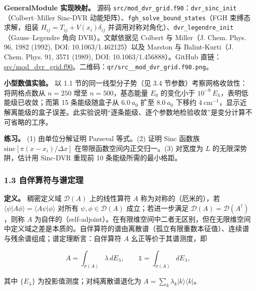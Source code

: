 \documentclass[
]{ctexbook}
\begin{document}
\textbf{GeneralModule 实现映射。} 源码
\texttt{src/mod\_dvr\_grid.f90}：\texttt{dvr\_sinc\_init}（Colbert--Miller
Sinc-DVR 动能矩阵）、\texttt{fgh\_solve\_bound\_states}（FGH
束缚态求解，组装 \(H_{ij}=T_{ij}+V(x_i)\delta_{ij}\)
并调用对称对角化）、\texttt{dvr\_legendre\_init}（Gauss--Legendre 角向
DVR）。文献依据见 Colbert 与 Miller（J. Chem. Phys. 96, 1982 (1992),
DOI: 10.1063/1.462125）以及 Marston 与 Balint-Kurti（J. Chem. Phys. 91,
3571 (1989), DOI: 10.1063/1.456888）。GitHub
直链：\href{https://github.com/l1Ha/QuantumGeneralModule/blob/main/src/mod_dvr_grid.f90}{src/mod\_dvr\_grid.f90}。二维码：\texttt{qr/src\_\_mod\_dvr\_grid.f90.png}。

\textbf{小型数值实验。} 以 1.1 节的同一线型分子势（见 3.4
节参数）考察网格收敛性：将网格点数从 \(n=250\) 增至 \(n=500\)，基态能量
\(E_0\) 的变化小于 \(10^{-9}\ E_h\)，表明低能级已收敛；而第 15
条能级随盒子从 \(6.0\ a_0\) 扩至 \(8.0\ a_0\) 下移约
\(4\ \mathrm{cm^{-1}}\)，显示近解离能级的盒子误差。此实验说明``逐条能级、逐个参数地检验收敛''是变分计算不可省略的工序。

\textbf{练习。} (1) 由单位分解证明 Parseval 等式。(2) 证明 Sinc 函数族
\(\mathrm{sinc}[\pi(x-x_i)/\Delta x]\) 在带限函数空间内正交归一。(3)
对宽度为 \(L\) 的无限深势阱，估计用 Sinc-DVR 重现前 10
条能级所需的最小格距。

\hypertarget{ux81eaux4f34ux7b97ux7b26ux4e0eux8c31ux5b9aux7406}{%
\subsubsection{1.3
自伴算符与谱定理}\label{ux81eaux4f34ux7b97ux7b26ux4e0eux8c31ux5b9aux7406}}

\textbf{定义。} 稠密定义域 \(\mathcal{D}(A)\) 上的线性算符 \(A\)
称为对称的（厄米的），若
\(\langle\psi|A\phi\rangle=\langle A\psi|\phi\rangle\) 对所有
\(\psi,\phi\in\mathcal{D}(A)\) 成立；若进一步满足
\(\mathcal{D}(A)=\mathcal{D}(A^{\dagger})\)，则称 \(A\)
为自伴的（self-adjoint）。在有限维空间中二者无区别，但在无限维空间中定义域之差是本质的。自伴算符的谱由离散谱（孤立有限重数本征值）、连续谱与残余谱组成；谱定理断言：自伴算符
\(A\) 幺正等价于其谱测度，即

\[A=\int_{\sigma(A)}\lambda\,dE_{\lambda},\qquad \mathbb{1}=\int_{\sigma(A)}dE_{\lambda},\]

其中 \(\{E_{\lambda}\}\) 为投影值测度；对纯离散谱退化为
\(A=\sum_k\lambda_k|k\rangle\langle k|\)。
\end{document}
